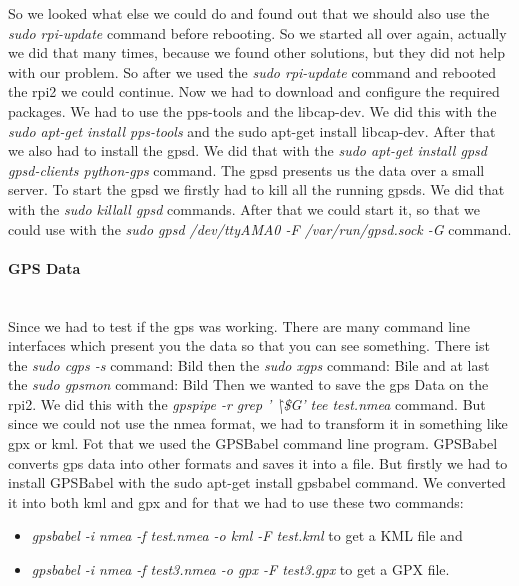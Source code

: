 So we looked what else we could do and found out that we should also use the \textit{sudo rpi-update} command before rebooting. So we started all over again, actually we did that many times, because we found other solutions, but they did not help with our problem. \newline
So after we used the \textit{sudo rpi-update} command and rebooted the \gls{rpi2} we could continue.\newline
 Now we had to download and configure the required packages. We had to use the pps-tools and the libcap-dev. We did this with the \textit{sudo apt-get install pps-tools} and the sudo apt-get install libcap-dev. After that we also had to install the \gls{gpsd}. We did that with the \textit{sudo apt-get install gpsd gpsd-clients python-gps} command. The gpsd presents us the data over a small server.\newline
To start the \gls{gpsd} we firstly had to kill all the running \gls{gpsd}s. We did that with the \textit{sudo killall gpsd} commands. After that we could start it, so that we could use with the \textit{sudo gpsd /dev/ttyAMA0 -F /var/run/gpsd.sock -G} command.

\paragraph{GPS Data} \mbox{}\\
Since we had to test if the \gls{gps} was working. There are many command line interfaces which present you the data so that you can see something.\newline
There ist the \textit{sudo cgps -s} command:\newline
Bild
\newline
then the \textit{sudo xgps} command:\newline
Bile
\newline
and at last the \textit{sudo gpsmon} command:\newline
Bild
\newline
Then we wanted to save the \gls{gps} Data on the \gls{rpi2}. We did this with the \textit{gpspipe -r \text{\textbar} grep ' \^\textbackslash \$G' \text{\textbar} tee test.nmea} command.
But since we could not use the \gls{nmea} format, we had to transform it in something like \gls{gpx} or \gls{kml}. Fot that we used the GPSBabel command line program. GPSBabel converts \gls{gps} data into other formats and saves it into a file. But firstly we had to install GPSBabel with the sudo apt-get install gpsbabel command. We converted it into both \gls{kml} and \gls{gpx} and for that we had to use these two commands: 
\begin{itemize}
\item \textit{gpsbabel -i nmea -f test.nmea -o kml -F test.kml} to get a KML file and
\item \textit{gpsbabel -i nmea -f test3.nmea -o gpx -F test3.gpx} to get a GPX file.
\end{itemize}

